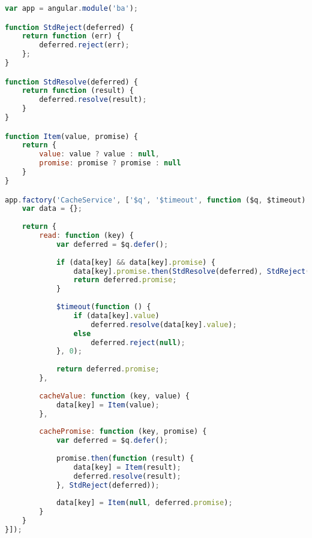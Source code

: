 \label{anhang1}
\begin{lstlisting}[language=JavaScript]
var app = angular.module('ba');

function StdReject(deferred) {
	return function (err) {
		deferred.reject(err);
	};
}

function StdResolve(deferred) {
	return function (result) {
		deferred.resolve(result);
	}
}

function Item(value, promise) {
	return {
		value: value ? value : null,
		promise: promise ? promise : null
	}
}

app.factory('CacheService', ['$q', '$timeout', function ($q, $timeout) {
	var data = {};
	
	return {
		read: function (key) {
			var deferred = $q.defer();
			
			if (data[key] && data[key].promise) {
				data[key].promise.then(StdResolve(deferred), StdReject(deferred));
				return deferred.promise;
			}
		
			$timeout(function () {
				if (data[key].value)
					deferred.resolve(data[key].value);
				else
					deferred.reject(null);
			}, 0);
		
			return deferred.promise;
		},
		
		cacheValue: function (key, value) {
			data[key] = Item(value);
		},
		
		cachePromise: function (key, promise) {
			var deferred = $q.defer();
			
			promise.then(function (result) {
				data[key] = Item(result);
				deferred.resolve(result);
			}, StdReject(deferred));
			
			data[key] = Item(null, deferred.promise);
		}
	}
}]);
\end{lstlisting}